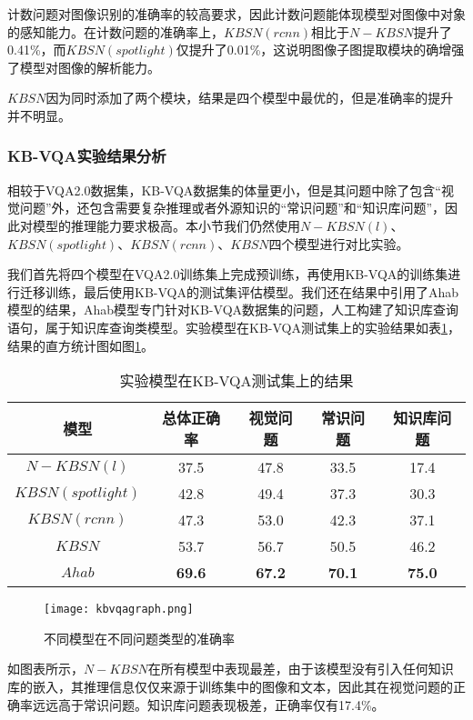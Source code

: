 计数问题对图像识别的准确率的较高要求，因此计数问题能体现模型对图像中对象的感知能力。在计数问题的准确率上，$KBSN(rcnn)$相比于$N-KBSN$提升了0.41\%，而$KBSN(spotlight)$仅提升了0.01\%，这说明图像子图提取模块的确增强了模型对图像的解析能力。

$KBSN$因为同时添加了两个模块，结果是四个模型中最优的，但是准确率的提升并不明显。

\subsubsection{KB-VQA实验结果分析}
相较于VQA2.0数据集，KB-VQA数据集的体量更小，但是其问题中除了包含“视觉问题”外，还包含需要复杂推理或者外源知识的“常识问题”和“知识库问题”，因此对模型的推理能力要求极高。本小节我们仍然使用$N-KBSN(l)$、$KBSN(spotlight)$、$KBSN(rcnn)$、$KBSN$四个模型进行对比实验。

我们首先将四个模型在VQA2.0训练集上完成预训练，再使用KB-VQA的训练集进行迁移训练，最后使用KB-VQA的测试集评估模型。我们还在结果中引用了Ahab模型的结果，Ahab模型专门针对KB-VQA数据集的问题，人工构建了知识库查询语句，属于知识库查询类模型。实验模型在KB-VQA测试集上的实验结果如表\ref{kbvqares}，结果的直方统计图如图\ref{kbvqagraph}。
\begin{table}[H]
\centering
\caption{实验模型在KB-VQA测试集上的结果}
\begin{tabular}{c|cccc}
\toprule
模型 & 总体正确率 & 视觉问题 & 常识问题 & 知识库问题\\
\midrule
$N-KBSN(l)$& 37.5 & 47.8 & 33.5 & 17.4\\
\midrule
$KBSN(spotlight)$&  42.8& 49.4&  37.3& 30.3\\
$KBSN(rcnn)$&  47.3& 53.0&  42.3& 37.1\\
$KBSN$&  53.7& 56.7&  50.5& 46.2\\
\midrule
$Ahab$&  \textbf{69.6}& \textbf{67.2}&  \textbf{70.1}& \textbf{75.0}\\
\bottomrule
\end{tabular}
\label{kbvqares}
\end{table}

\begin{figure}[H]
	\centering
	\texttt{[image: kbvqagraph.png]}
	\caption{不同模型在不同问题类型的准确率}
	\label{kbvqagraph}
\end{figure}

如图表所示，$N-KBSN$在所有模型中表现最差，由于该模型没有引入任何知识库的嵌入，其推理信息仅仅来源于训练集中的图像和文本，因此其在视觉问题的正确率远远高于常识问题。知识库问题表现极差，正确率仅有17.4\%。

